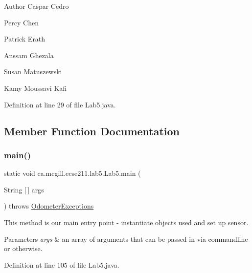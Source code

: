 \begin{DoxyAuthor}{Author}
Caspar Cedro 

Percy Chen 

Patrick Erath 

Anssam Ghezala 

Susan Matuszewski 

Kamy Moussavi Kafi 
\end{DoxyAuthor}


Definition at line 29 of file Lab5.\+java.



\subsection{Member Function Documentation}
\mbox{\label{classca_1_1mcgill_1_1ecse211_1_1lab5_1_1_lab5_a82cca51f550ed0eb016bb2082d3fe755}} 
\subsubsection{\texorpdfstring{main()}{main()}}
{\footnotesize\ttfamily static void ca.\+mcgill.\+ecse211.\+lab5.\+Lab5.\+main (\begin{DoxyParamCaption}\item[{String \mbox{[}$\,$\mbox{]}}]{args }\end{DoxyParamCaption}) throws \hyperlink{classca_1_1mcgill_1_1ecse211_1_1odometer_1_1_odometer_exceptions}{Odometer\+Exceptions}\hspace{0.3cm}{\ttfamily [static]}}

This method is our main entry point -\/ instantiate objects used and set up sensor.


\begin{DoxyParams}{Parameters}
{\em args} & an array of arguments that can be passed in via commandline or otherwise. \\
\hline
\end{DoxyParams}


Definition at line 105 of file Lab5.\+java.

